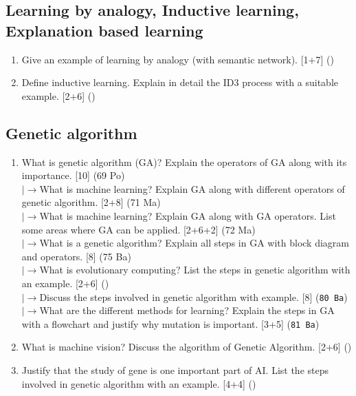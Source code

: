 \documentclass[12pt]{article}
\newcommand{\lb}{\\$\left|\rightarrow\right.$}
\begin{document}
  \subsection{Learning by analogy, Inductive learning, Explanation based learning}
    \begin{enumerate}[topsep=0pt, noitemsep]
      \item Give an example of learning by analogy (with semantic network). \hfill [1+7] ()

      \item Define inductive learning. Explain in detail the ID3 process with a suitable example. \hfill [2+6] ()
    \end{enumerate}

  \subsection{Genetic algorithm}
    \begin{enumerate}[topsep=0pt, noitemsep]
      \item What is genetic algorithm (GA)? Explain the operators of GA along with its importance. \hfill [10] (69 Po)
        \lb What is machine learning? Explain GA along with different operators of genetic algorithm. \hfill [2+8] (71 Ma)
        \lb What is machine learning? Explain GA along with GA operators. List some areas where GA can be applied. \hfill [2+6+2] (72 Ma)
        \lb What is a genetic algorithm? Explain all steps in GA with block diagram and operators. \hfill [8] (75 Ba)
        \lb What is evolutionary computing? List the steps in genetic algorithm with an example. \hfill [2+6] ()
        \lb Discuss the steps involved in genetic algorithm with example. \hfill [8] (\texttt{80 Ba})
        \lb What are the different methods for learning? Explain the steps in GA with a flowchart and justify why mutation is important. \hfill [3+5] (\texttt{81 Ba})

      \item What is machine vision? Discuss the algorithm of Genetic Algorithm. \hfill [2+6] ()

      \item Justify that the study of gene is one important part of AI. List the steps involved in genetic algorithm with an example. \hfill [4+4] ()
    \end{enumerate}
\end{document}
